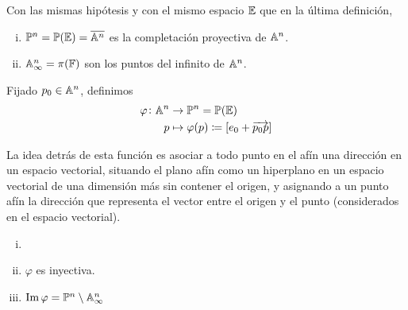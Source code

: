 \begin{defi}
  Con las mismas hipótesis y con el mismo espacio $\mathbb{E}$ que en la última definición,
  \begin{enumerate}[i)]
    \item $\mathbb{P}^n = \mathbb{P} (\mathbb{E}) = \overline{\mathbb{A}^n}$ es la completación proyectiva
    de $\mathbb{A}^n$.
    \item $\mathbb{A}^n_\infty = \pi(\mathbb{F})$ son los puntos del infinito de $\mathbb{A}^n$.
  \end{enumerate}
\end{defi}

\begin{defi*}
  Fijado $p_0 \in \mathbb{A}^n$, definimos
   \[
     \begin{aligned}
       \varphi \colon \mathbb{A}^n &\to \mathbb{P}^n = \mathbb{P}(\mathbb{E})\\
       p &\mapsto \varphi(p) \coloneqq [e_0 + \overrightarrow{p_0p}]
     \end{aligned}
   \]
\end{defi*}

\begin{obs}
  La idea detrás de esta función es asociar a todo punto en el afín una dirección
  en un espacio vectorial, situando el plano afín como un hiperplano 
  en un espacio vectorial de una dimensión más sin contener el origen, 
  y asignando a un punto afín la dirección que representa el vector entre el origen
  y el punto (considerados en el espacio vectorial).
\end{obs}

\begin{prop}
  \begin{enumerate}[i)]
    \item[]
    \item $\varphi$ es inyectiva.
    \item $\operatorname{Im} \varphi = \mathbb{P}^n \setminus \mathbb{A}^n_\infty$
  \end{enumerate}
\end{prop}

